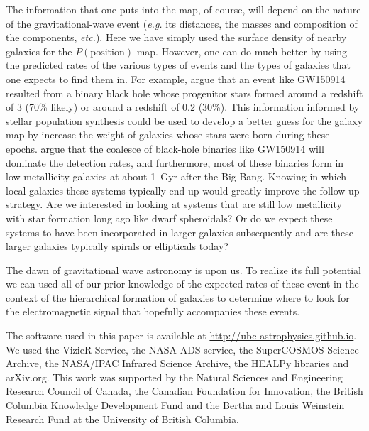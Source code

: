 \documentclass[useAMS,usenatbib]{mn2e}
\begin{document}
The information that one puts into the map, of course, will depend on
the nature of the gravitational-wave event ({\em e.g.} its distances,
the masses and composition of the components, {\em etc.}).  Here we
have simply used the surface density of nearby galaxies for the
$P(\mathrm{position})$ map.  However, one can do much better by using
the predicted rates of the various types of events and the types of
galaxies that one expects to find them in.  For example,
\citet{2016arXiv160204531B} argue that an event like GW150914 resulted
from a binary black hole whose progenitor stars formed around a
redshift of 3 (70\% likely) or around a redshift of 0.2 (30\%).  This
information informed by stellar population synthesis could be used to
develop a better guess for the galaxy map by increase the weight of
galaxies whose stars were born during these epochs.
\citet{2015ApJ...806..263D} argue that the coalesce of black-hole
binaries like GW150914 will dominate the detection rates, and
furthermore, most of these binaries form in low-metallicity galaxies
at about 1~Gyr after the Big Bang.  Knowing in which local galaxies
these systems typically end up would greatly improve the follow-up
strategy.  Are we interested in looking at systems that are still low
metallicity with star formation long ago like dwarf spheroidals?  Or
do we expect these systems to have been incorporated in larger galaxies
subsequently and are these larger galaxies typically spirals or
ellipticals today?

The dawn of gravitational wave astronomy is upon us.  To realize its
full potential we can used all of our prior knowledge of the expected
rates of these event in the context of the hierarchical formation of
galaxies to determine where to look for the electromagnetic signal
that hopefully accompanies these events.


The software used in this paper is available at
\url{http://ubc-astrophysics.github.io}.  We used the VizieR Service,
the NASA ADS service, the SuperCOSMOS Science Archive, the NASA/IPAC
Infrared Science Archive, the HEALPy libraries and arXiv.org. This work
was supported by the Natural Sciences and Engineering Research Council
of Canada, the Canadian Foundation for Innovation, the British
Columbia Knowledge Development Fund and the Bertha and Louis Weinstein
Research Fund at the University of British Columbia.






\label{lastpage}
\end{document}
